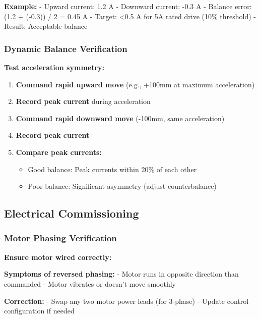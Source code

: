 \documentclass[
]{article}
\providecommand{\tightlist}{%
  \setlength{\itemsep}{0pt}\setlength{\parskip}{0pt}}
\begin{document}
\textbf{Example:} - Upward current: 1.2 A - Downward current: -0.3 A -
Balance error: (1.2 + (-0.3)) / 2 = 0.45 A - Target: \textless0.5 A for
5A rated drive (10\% threshold) - Result: Acceptable balance

\subsubsection{Dynamic Balance
Verification}\label{dynamic-balance-verification}

\textbf{Test acceleration symmetry:}

\begin{enumerate}
\def\labelenumi{\arabic{enumi}.}
\tightlist
\item
  \textbf{Command rapid upward move} (e.g., +100mm at maximum
  acceleration)
\item
  \textbf{Record peak current} during acceleration
\item
  \textbf{Command rapid downward move} (-100mm, same acceleration)
\item
  \textbf{Record peak current}
\item
  \textbf{Compare peak currents:}

  \begin{itemize}
  \tightlist
  \item
    Good balance: Peak currents within 20\% of each other
  \item
    Poor balance: Significant asymmetry (adjust counterbalance)
  \end{itemize}
\end{enumerate}

\subsection{Electrical Commissioning}\label{electrical-commissioning}

\subsubsection{Motor Phasing
Verification}\label{motor-phasing-verification}

\textbf{Ensure motor wired correctly:}

\textbf{Symptoms of reversed phasing:} - Motor runs in opposite
direction than commanded - Motor vibrates or doesn't move smoothly

\textbf{Correction:} - Swap any two motor power leads (for 3-phase) -
Update control configuration if needed
\end{document}
